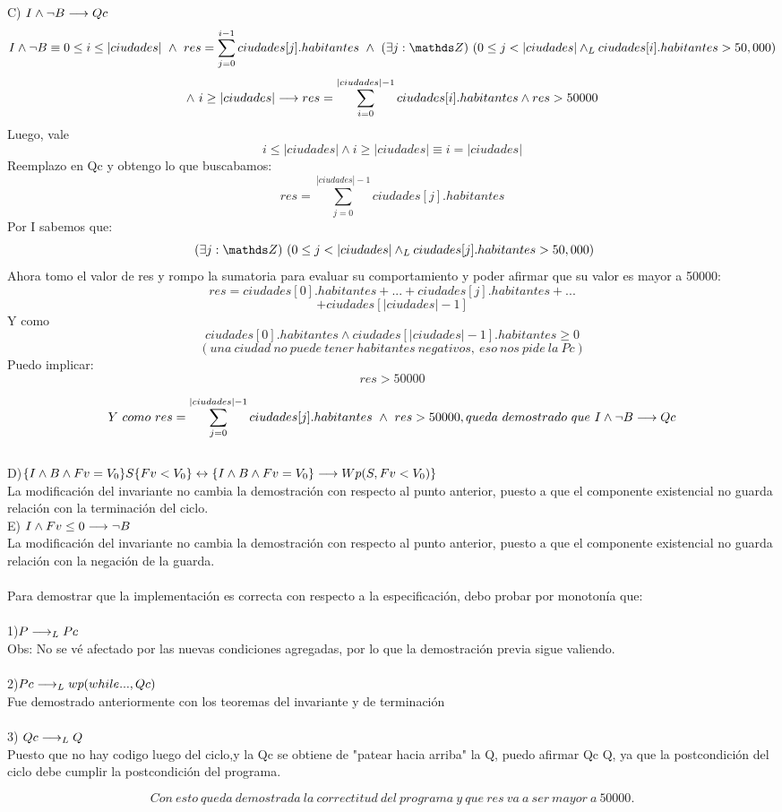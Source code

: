\documentclass[10pt,a4paper]{article}
\begin{document}
C) $I \land \neg B \longrightarrow Qc$\\
	\[I \land \neg B \equiv 0\leq i \leq |ciudades| \ \land \ res = \sum\limits_{j=0}^{i-1}ciudades[j].habitantes \  \land \  \existe[unalinea]j{\ent}{0\leq j <|ciudades| \yLuego ciudades[i].habitantes > 50,000} \]
	\[ \land \ i \geq |ciudades| \longrightarrow res = \sum\limits_{i=0}^{|ciudades|-1}ciudades[i].habitantes \land res>50000  \]
Luego, vale \[i \leq |ciudades| \land i \geq |ciudades| \equiv i=|ciudades|\]	
Reemplazo en Qc y obtengo lo que buscabamos:
	\[res= \sum\limits_{j=0}^{|ciudades|-1}ciudades[j].habitantes  \]
Por I sabemos que:
\[ \ \existe[unalinea]j{\ent}{0\leq j <|ciudades| \yLuego ciudades[j].habitantes > 50,000}  \]
Ahora tomo el valor de res y rompo la sumatoria para evaluar su comportamiento y poder afirmar que su valor es mayor a 50000:
	\[res = ciudades[0].habitantes+...+ciudades[j].habitantes+...\]
	\[+ciudades[|ciudades|-1]  \]
Y como 
 \[ciudades[0].habitantes \land ciudades[|ciudades|-1] .habitantes \geq 0\] \[(una \ ciudad  \   no\ puede \ tener \ habitantes\  negativos, \ eso \ nos\ pide\ la\ Pc)\]
Puedo implicar:
	\[res >50000\]

	\[Y \ como \ res= \sum\limits_{j=0}^{|ciudades|-1}ciudades[j].habitantes \ \land \ res>50000, queda \ demostrado \ que \ I \land \neg B \implica Qc   \] \\

D)$\{I \land B \land Fv = V_0\} S \{Fv < V_0\} \leftrightarrow \{I \land B \land Fv = V_0\} \longrightarrow Wp (S, Fv < V_0 )\}$\\ La modificación del invariante no cambia la demostración con respecto al punto anterior, puesto a que el componente existencial no guarda relación con la terminación del ciclo. \\

E) $I \land Fv \leq 0 \longrightarrow \neg B$\\ La modificación del invariante no cambia la demostración con respecto al punto anterior, puesto a que el componente existencial no guarda relación con la negación de la guarda.
\\
\\
Para demostrar que la implementación es correcta con respecto a la especificación, debo probar por monotonía que:\\ \\
1)$ P\longrightarrow _L Pc$\\ \hspace{0.5cm}
Obs: No se vé afectado por las nuevas condiciones agregadas, por lo que la demostración previa sigue valiendo.
\\ \\
2)$Pc \longrightarrow _L wp(while..., Qc)$ \\ \hspace{0.5cm}
Fue demostrado anteriormente con los teoremas del invariante y de terminación \\ \\
3) $Qc \longrightarrow _L Q$ \\
Puesto que no hay codigo luego del ciclo,y la Qc se obtiene de "patear hacia arriba" la Q, puedo afirmar Qc \implica Q, ya que la postcondición del ciclo debe cumplir la postcondición del programa.


\[Con\ esto\ queda\ demostrada\ la\ correctitud\ del\ programa\ y\ que\ res\ va\ a\ ser\ mayor\ a\ 50000.\]
\end{document}
